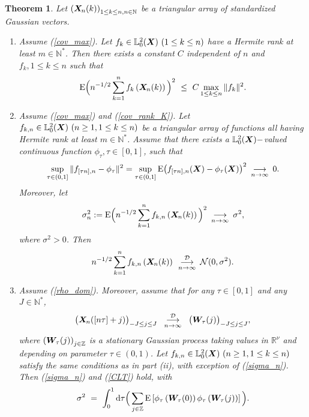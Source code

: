 \documentclass[10pt]{article}
\def\N{\mathbb{N}}
\def\L{\mathbb{L}}
\def\R{\mathbb{R}}
\def\Z{\mathbb{Z}}
\def\d{\mathrm d}
\def\E{\mathrm E}
\newcommand{\mbf}[1]{\mbox{\boldmath $#1$}}
\def\limiteloin{\renewcommand{\arraystretch}{0.5}
\begin{array}[t]{c}
\stackrel{{\cal D}}{\longrightarrow} \\
{\scriptstyle n \rightarrow\infty}
\end{array}\renewcommand{\arraystretch}{1}}
\def\limiten{\renewcommand{\arraystretch}{0.5}
\begin{array}[t]{c}
\stackrel{}{\longrightarrow} \\
{\scriptstyle n\rightarrow\infty}
\end{array}\renewcommand{\arraystretch}{1}}
\newtheorem{thm}{Theorem}
\begin{document}
\begin{thm}\label{tlcgauss}
Let $\left({\mbf X}_{\! n}(k) \right)_{1\le k \le n, n \in {\N}} $
be a  triangular array of standardized Gaussian
vectors.
\begin{enumerate}
\item [(i)] Assume (\ref{cov_max}).
Let $f_k\in \L^2_0({\mbf X}) \ (1\le k \le n)$ have a Hermite rank at
least $m \in \N^*$.
Then there exists a constant $C$ independent of
$n$ and $f_k, 1\le k \le n$ such that
\begin{equation}
\E \Big(n^{-1/2} \sum_{k=1}^n f_k\left({\mbf X}_{\! n}(k)\right)
\Big)^2 \  \leq \ C \max_{1\le k \le n} \|f_k\|^2.
\label{f_bdd}
\end{equation}
\item [(ii)] Assume (\ref{cov_max}) and (\ref{cov_rank_K}).
Let $f_{k,n} \in  \L^2_0({\mbf X}) \ (n \ge 1, 1 \le k \le n)$ be a
triangular array of functions all having Hermite rank at least $m
\in \N^*$. Assume that there exists a $ \L^2_0({\mbf X})-$valued
continuous function $\phi_\tau, \tau \in [0,1]$, such that
\begin{equation}
\sup_{\tau \in (0,1]} \|f_{[\tau n],n} - \phi_{\tau}\|^2 =
\sup_{\tau \in (0,1]} \E \big(f_{[\tau n],n}({\mbf X}) -
\phi_{\tau}({\mbf X})\big)^2 \limiten 0. \label{f_n}
\end{equation}
Moreover, let
\begin{equation}
\sigma^2_n := \E \Big(n^{-1/2} \sum_{k=1}^n f_{k,n}\left({\mbf
X}_{\! n}(k)\right) \Big)^2\limiten \sigma^2, \label{sigma_n}
\end{equation}
where $\sigma^2 >0$. Then
\begin{equation}
n^{-1/2} \sum_{k=1}^n f_{k,n}\left({\mbf X}_{\! n}(k)\right)
\limiteloin {\mathcal N}(0, \sigma^2). \label{CLT}
\end{equation}
\item [(iii)] Assume
(\ref{rho_dom}). Moreover, assume that for any $\tau \in [0,1]$ and
any $J \in \N^*$,
\begin{equation}
\big({\mbf X}_{\! n}([n\tau]+j)\big)_{-J \le j \le J} \
\limiteloin \  \big({\mbf W}_{\! \tau}(j)\big)_{-J \le j \le J}
,   \label{Y_W}
\end{equation}
where $ \left({\mbf W}_{\! \tau}(j)\right)_{j\in {\Z}}$ is a
stationary Gaussian process taking values in ${\R}^\nu$ and
depending on parameter $\tau \in (0,1)$. Let  $f_{k,n} \in
\L^2_0({\mbf X}) \ (n \ge 1, 1 \le k \le n)$ satisfy the same
conditions as in part (ii), with exception of (\ref{sigma_n}).
Then (\ref{sigma_n}) and (\ref{CLT}) hold, with
\begin{equation}
\sigma^2 \ = \  \int_0^1 \d \tau  \Big(\sum_{j\in {\Z}} \E \left[
\phi_\tau \left({\mbf W}_{\! \tau}(0)\right) \phi_\tau \left({\mbf
W}_{\! \tau}(j)\right)\right ]\Big).  \label{sigma}
\end{equation}
\end{enumerate}
\end{thm}
\end{document}
